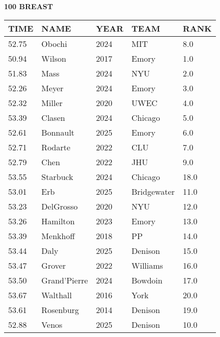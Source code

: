 \begin{minipage}[t]{0.48\textwidth}
\centering
\textbf{100 BREAST}\\[0.05cm]
\begin{tabular}{@{}p{1.8cm}p{2.8cm}p{1.2cm}p{1.4cm}p{0.8cm}@{}}
\hline
\textbf{TIME} & \textbf{NAME} & \textbf{YEAR} & \textbf{TEAM} & \textbf{RANK} \\
\hline
52.75 & Obochi & 2024 & MIT & 8.0 \\
50.94 & Wilson & 2017 & Emory & 1.0 \\
51.83 & Mass & 2024 & NYU & 2.0 \\
52.26 & Meyer & 2024 & Emory & 3.0 \\
52.32 & Miller & 2020 & UWEC & 4.0 \\
53.39 & Clasen & 2024 & Chicago & 5.0 \\
52.61 & Bonnault & 2025 & Emory & 6.0 \\
52.71 & Rodarte & 2022 & CLU & 7.0 \\
52.79 & Chen & 2022 & JHU & 9.0 \\
53.55 & Starbuck & 2024 & Chicago & 18.0 \\
53.01 & Erb & 2025 & Bridgewater & 11.0 \\
53.23 & DelGrosso & 2020 & NYU & 12.0 \\
53.26 & Hamilton & 2023 & Emory & 13.0 \\
53.39 & Menkhoff & 2018 & PP & 14.0 \\
53.44 & Daly & 2025 & Denison & 15.0 \\
53.47 & Grover & 2022 & Williams & 16.0 \\
53.50 & Grand'Pierre & 2024 & Bowdoin & 17.0 \\
53.67 & Walthall & 2016 & York & 20.0 \\
53.61 & Rosenburg & 2014 & Denison & 19.0 \\
52.88 & Venos & 2025 & Denison & 10.0 \\
\hline
\end{tabular}
\end{minipage}\hfill
